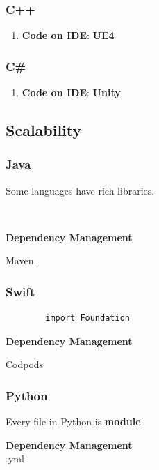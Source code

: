 \documentclass[12pt, a4paper]{report}
\begin{document}
        \subsubsection{C++}
        \begin{enumerate}
            \item \textbf{Code on IDE}: \quad \textbf{UE4}\par 
        \end{enumerate}
        
        \subsubsection{C\#}
        \begin{enumerate}
            \item \textbf{Code on IDE}: \quad \textbf{Unity}\par 
        \end{enumerate}
        
			
		
	\subsection{Scalability}
		\subsubsection{Java}
		Some languages have rich libraries. \par
		\begin{lstlisting}
		
		\end{lstlisting}
		\textbf{Dependency Management} \par
		Maven.
		
		\subsubsection{Swift}
		\begin{lstlisting}
		import Foundation
		\end{lstlisting}
		\textbf{Dependency Management} \par
		Codpods
		
		\subsubsection{Python}
		Every file in Python is \textbf{module} \par
		\textbf{Dependency Management} \\
		.yml
\end{document}

